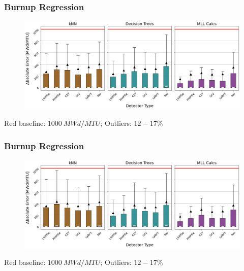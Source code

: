 \begin{frame}
  \frametitle{Burnup Regression}
  \begin{adjustwidth}{-15pt}{-10pt}
  \begin{figure}
    \centering
    \includegraphics[width=1.1\textwidth]{./figures/abserror_boxplots_short_burn.png}
  \end{figure}
  \vspace{12pt} \centering Red baseline: $1000\:MWd/MTU$; Outliers: $12-17\%$
  \end{adjustwidth}
\end{frame}

\begin{frame}
  \frametitle{Burnup Regression}
  \begin{adjustwidth}{-15pt}{-10pt}
  \begin{figure}
    \centering
    \includegraphics[width=1.1\textwidth]{./figures/abserror_boxplots_long_burn.png}
  \end{figure}
  \vspace{12pt} \centering Red baseline: $1000\:MWd/MTU$; Outliers: $12-17\%$
  \end{adjustwidth}
\end{frame}

